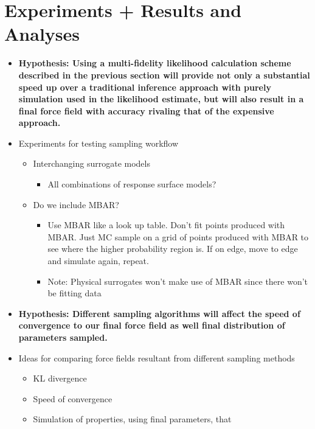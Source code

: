 \documentclass[aps,pre,nofootinbib,superscriptaddress,linenumbers,10pt, draft,tightenlines]{revtex4-1}
\begin{document}
\section{Experiments + Results and Analyses}
\begin{itemize}
	\item \textbf{Hypothesis: Using a multi-fidelity likelihood calculation scheme described in the previous section will provide not only a substantial
	      speed up over a traditional inference approach with purely simulation used in the likelihood estimate, but 
	      will also result in a final force field with accuracy rivaling that of the expensive approach.}
	\item Experiments for testing sampling workflow
	\begin{itemize}
		\item Interchanging surrogate models
		\begin{itemize}
			\item All combinations of response surface models?
		\end{itemize}
	    \item Do we include MBAR?
	    \begin{itemize}
	    	\item Use MBAR like a look up table. Don't fit points produced with MBAR. Just MC sample on a grid of points produced with MBAR to see 
	    	      where the higher probability region is. If on edge, move to edge and simulate again, repeat.
	    \end{itemize}
	    \begin{itemize}
	    	\item Note: Physical surrogates won't make use of MBAR since 
	    	      there won't be fitting data
	    \end{itemize}        
	\end{itemize}
    \item \textbf{Hypothesis: Different sampling algorithms will affect the speed of convergence to our final force field as well final distribution of parameters
          sampled.}
    \item Ideas for comparing force fields resultant from different sampling methods
    \begin{itemize}
    	\item KL divergence
    	\item Speed of convergence
    	\item Simulation of properties, using final parameters, that 

\end{itemize}
\end{itemize}
\end{document}
